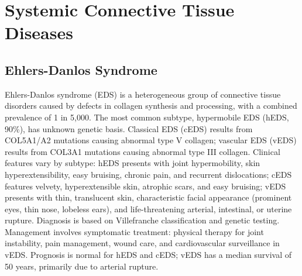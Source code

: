\section{Systemic Connective Tissue Diseases}








\label{sec:Systemic Connective Tissue Diseases}

\subsection{Ehlers-Danlos Syndrome}
\label{sec:Ehlers-Danlos Syndrome}
Ehlers-Danlos syndrome (EDS) is a heterogeneous group of connective tissue disorders caused by defects in collagen synthesis and processing, with a combined prevalence of 1 in 5,000. The most common subtype, hypermobile EDS (hEDS, 90\%), has unknown genetic basis. Classical EDS (cEDS) results from COL5A1/A2 mutations causing abnormal type V collagen; vascular EDS (vEDS) results from COL3A1 mutations causing abnormal type III collagen. Clinical features vary by subtype: hEDS presents with joint hypermobility, skin hyperextensibility, easy bruising, chronic pain, and recurrent dislocations; cEDS features velvety, hyperextensible skin, atrophic scars, and easy bruising; vEDS presents with thin, translucent skin, characteristic facial appearance (prominent eyes, thin nose, lobeless ears), and life-threatening arterial, intestinal, or uterine rupture. Diagnosis is based on Villefranche classification and genetic testing. Management involves symptomatic treatment: physical therapy for joint instability, pain management, wound care, and cardiovascular surveillance in vEDS. Prognosis is normal for hEDS and cEDS; vEDS has a median survival of 50 years, primarily due to arterial rupture.

